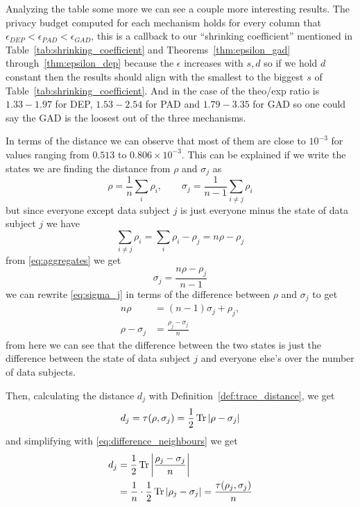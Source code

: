 \documentclass{ieeeaccess}
\begin{document}
Analyzing the table some more we can see a couple more interesting results. The privacy budget computed for each mechanism holds for every column that $\epsilon_{DEP} < \epsilon_{PAD} < \epsilon_{GAD}$, this is a callback to our ``shrinking coefficient'' mentioned in Table~\ref{tab:shrinking_coefficient} and Theorems~\ref{thm:epsilon_gad} through~\ref{thm:epsilon_dep} because the $\epsilon$ increases with $s, d$ so if we hold $d$ constant then the results should align with the smallest to the biggest $s$ of Table~\ref{tab:shrinking_coefficient}. And in the case of the theo/exp ratio is $1.33 - 1.97$ for DEP, $1.53 - 2.54$ for PAD and $1.79 - 3.35$ for GAD so one could say the GAD is the loosest out of the three mechanisms.

In terms of the distance we can observe that most of them are close to $10^{-3}$ for values ranging from $0.513$ to $0.806 \times 10^{-3}$. This can be explained if we write the states we are finding the distance from $\rho$ and $\sigma_j$ as
\begin{equation}
  \rho = \frac{1}{n}\sum_{i} \rho_i, \qquad \sigma_j = \frac{1}{n-1}\sum_{i \neq j} \rho_i
  \label{eq:aggregates}
\end{equation}
but since everyone except data subject $j$ is just everyone minus the state of data subject $j$ we have
\begin{equation}
  \sum_{i \neq j} \rho_i = \sum_{i} \rho_i - \rho_j = n\rho - \rho_j
  \label{eq:sum_except_j}
\end{equation}
from \eqref{eq:aggregates} we get
\begin{equation}
  \sigma_j = \frac{n\rho - \rho_j}{n-1}
  \label{eq:sigma_j}
\end{equation}
we can rewrite \eqref{eq:sigma_j} in terms of the difference between $\rho$ and $\sigma_j$ to get
\begin{equation}
  \begin{aligned}
    n\rho &= (n-1)\sigma_j + \rho_j, \\
    \rho - \sigma_j &= \frac{\rho_j - \sigma_j}{n}
  \end{aligned}
  \label{eq:difference_neighbours}
\end{equation}
from here we can see that the difference between the two states is just the difference between the state of data subject $j$ and everyone else's over the number of data subjects.

Then, calculating the distance $d_j$ with Definition~\ref{def:trace_distance}, we get
\begin{equation}
  d_j = \tau(\rho, \sigma_j) = \frac{1}{2}\Tr\abs{\rho - \sigma_j}
  \label{eq:d_j}
\end{equation}
and simplifying with \eqref{eq:difference_neighbours} we get
\begin{equation}
  \begin{aligned}
    d_j &= \frac{1}{2}\Tr\abs{\frac{\rho_j - \sigma_j}{n}} \\
    &= \frac{1}{n}\cdot\frac{1}{2}\Tr\abs{\rho_j - \sigma_j} = \frac{\tau(\rho_j, \sigma_j)}{n}
  \end{aligned}
  \label{eq:d_j_person}
\end{equation}
\end{document}
